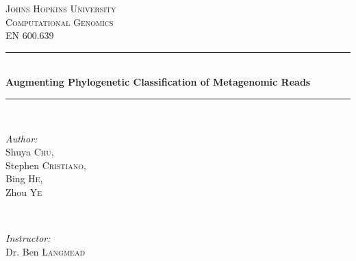 \documentclass[12pt]{article} %
\begin{document}
\begin{titlepage}

\newcommand{\HRule}{\rule{\linewidth}{0.5mm}} %

\center %
 

\textsc{\LARGE Johns Hopkins University}\\[1.5cm] %
\textsc{\Large Computational Genomics}\\[0.5cm] %
\textsc{\large EN 600.639}\\[0.5cm] %


\HRule \\[0.4cm]
{ \huge \bfseries Augmenting Phylogenetic Classification of Metagenomic Reads}\\[0.4cm] %
\HRule \\[1.5cm]
 

\begin{minipage}{0.4\textwidth}
\begin{flushleft} \large
\emph{Author:}\\
Shuya \textsc{Chu}, \\  Stephen \textsc{Cristiano}, \\ Bing \textsc{He},\\  Zhou \textsc{Ye} %
\end{flushleft}
\end{minipage}
~
\begin{minipage}{0.4\textwidth}
\begin{flushright} \large
\emph{Instructor:} \\
Dr. Ben \textsc{Langmead} %
\end{flushright}
\end{minipage}\\[4cm]


\end{titlepage}
\end{document}
